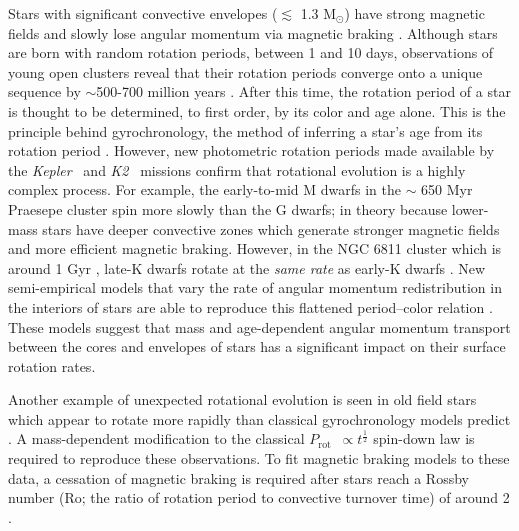 \documentclass{aastex63}
\newcommand{\eg}{{\it e.g.}}
\newcommand{\kepler}{{\it Kepler}}
\newcommand{\Ktwo}{{\it K2}}
\newcommand{\ktwo}{\Ktwo}
\newcommand{\prot}{$P_{\mathrm{rot}}$}
\begin{document}
Stars with significant convective envelopes ($\lesssim$ 1.3 M$_\odot$) have
strong magnetic fields and slowly lose angular momentum via magnetic braking
\citep[\eg][]{schatzman1962, weber1967, kraft1967, skumanich1972, kawaler1988,
pinsonneault1989}.
Although stars are born with random rotation periods, between 1 and 10 days,
observations of young open clusters reveal that their rotation periods
converge onto a unique sequence by $\sim$500-700 million years
\citep[\eg][]{irwin2009, gallet2013}.
After this time, the rotation period of a star is thought to be determined, to
first order, by its color and age alone.
This is the principle behind gyrochronology, the method of inferring a star’s
age from its rotation period \citep[\eg][]{skumanich1972, barnes2003,
barnes2007, mamajek2008, barnes2010, meibom2011, meibom2015}.
However, new photometric rotation periods made available by the \kepler\
\citep{borucki2010} and \ktwo\ \citep{howell2014} missions
\citep[\eg][]{mcquillan2014, garcia2014, douglas2017, rebull2017, meibom2011,
meibom2015, curtis2019} confirm that rotational evolution is a highly complex
process.
For example, the early-to-mid M dwarfs in the $\sim$ 650 Myr Praesepe cluster
spin more slowly than the G dwarfs; in theory because lower-mass stars have
deeper convective zones which generate stronger magnetic fields and more
efficient magnetic braking.
However, in the NGC 6811 cluster which is around 1 Gyr \citep{janes2011,
sandquist2016},
late-K dwarfs rotate at the {\it same rate} as early-K dwarfs
\citep{curtis2019}.
New semi-empirical models that vary the rate of angular momentum
redistribution in the interiors of stars are able to reproduce this flattened
period--color relation \citep{spada2019}.
These models suggest that mass and age-dependent angular momentum transport
between the cores and envelopes of stars has a significant impact on their
surface rotation rates.

Another example of unexpected rotational evolution is seen in old field stars
which appear to rotate more rapidly than classical gyrochronology models
predict \citep{angus2015, vansaders2016, vansaders2018, metcalfe2019}.
A mass-dependent modification to the classical \prot\ $\propto
t^{\frac{1}{2}}$ spin-down law \citep{skumanich1972} is required to reproduce
these observations.
To fit magnetic braking models to these data, a cessation of magnetic braking
is required after stars reach a Rossby number (Ro; the ratio of rotation
period to convective turnover time) of around 2 \citep{vansaders2016,
vansaders2018}.
\end{document}
